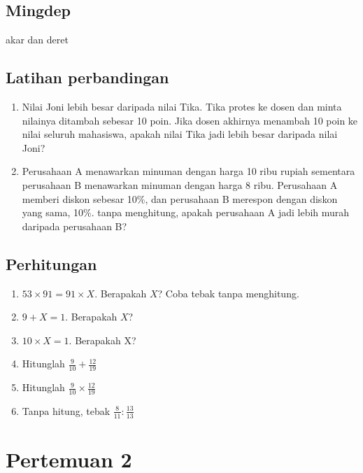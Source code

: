 \documentclass[
  letterpaper,
  DIV=11,
  numbers=noendperiod]{scrartcl}
\begin{document}
\subsection{Mingdep}\label{mingdep}

akar dan deret

\subsection{Latihan perbandingan}\label{latihan-perbandingan}

\begin{enumerate}
\def\labelenumi{\arabic{enumi}.}
\item
  Nilai Joni lebih besar daripada nilai Tika. Tika protes ke dosen dan
  minta nilainya ditambah sebesar 10 poin. Jika dosen akhirnya menambah
  10 poin ke nilai seluruh mahasiswa, apakah nilai Tika jadi lebih besar
  daripada nilai Joni?
\item
  Perusahaan A menawarkan minuman dengan harga 10 ribu rupiah sementara
  perusahaan B menawarkan minuman dengan harga 8 ribu. Perusahaan A
  memberi diskon sebesar 10\%, dan perusahaan B merespon dengan diskon
  yang sama, 10\%. tanpa menghitung, apakah perusahaan A jadi lebih
  murah daripada perusahaan B?
\end{enumerate}

\subsection{Perhitungan}\label{perhitungan}

\begin{enumerate}
\def\labelenumi{\arabic{enumi}.}
\item
  \(53 \times 91 = 91 \times X\). Berapakah \(X\)? Coba tebak tanpa
  menghitung.
\item
  \(9+X=1\). Berapakah \(X\)?
\item
  \(10 \times X = 1\). Berapakah X?
\item
  Hitunglah \(\frac{9}{10}+\frac{12}{19}\)
\item
  Hitunglah \(\frac{9}{10} \times \frac{12}{19}\)
\item
  Tanpa hitung, tebak \(\frac{8}{11} : \frac{13}{13}\)
\end{enumerate}

\section{Pertemuan 2}\label{pertemuan-2}
\end{document}
